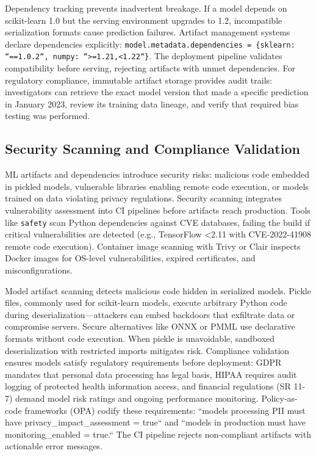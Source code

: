Dependency tracking prevents inadvertent breakage. If a model depends on scikit-learn 1.0 but the serving environment upgrades to 1.2, incompatible serialization formats cause prediction failures. Artifact management systems declare dependencies explicitly: \texttt{model.metadata.dependencies = \{sklearn: ``==1.0.2``, numpy: ``>=1.21,<1.22``\}}. The deployment pipeline validates compatibility before serving, rejecting artifacts with unmet dependencies. For regulatory compliance, immutable artifact storage provides audit trails: investigators can retrieve the exact model version that made a specific prediction in January 2023, review its training data lineage, and verify that required bias testing was performed.

\subsection{Security Scanning and Compliance Validation}

ML artifacts and dependencies introduce security risks: malicious code embedded in pickled models, vulnerable libraries enabling remote code execution, or models trained on data violating privacy regulations. Security scanning integrates vulnerability assessment into CI pipelines before artifacts reach production. Tools like \texttt{safety} scan Python dependencies against CVE databases, failing the build if critical vulnerabilities are detected (e.g., TensorFlow <2.11 with CVE-2022-41908 remote code execution). Container image scanning with Trivy or Clair inspects Docker images for OS-level vulnerabilities, expired certificates, and misconfigurations.

Model artifact scanning detects malicious code hidden in serialized models. Pickle files, commonly used for scikit-learn models, execute arbitrary Python code during deserialization---attackers can embed backdoors that exfiltrate data or compromise servers. Secure alternatives like ONNX or PMML use declarative formats without code execution. When pickle is unavoidable, sandboxed deserialization with restricted imports mitigates risk. Compliance validation ensures models satisfy regulatory requirements before deployment: GDPR mandates that personal data processing has legal basis, HIPAA requires audit logging of protected health information access, and financial regulations (SR 11-7) demand model risk ratings and ongoing performance monitoring. Policy-as-code frameworks (OPA) codify these requirements: ``models processing PII must have privacy\_impact\_assessment = true`` and ``models in production must have monitoring\_enabled = true.`` The CI pipeline rejects non-compliant artifacts with actionable error messages.

